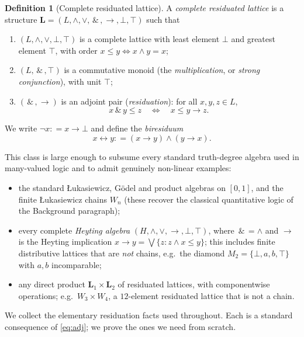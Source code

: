 \documentclass{amsart}
\theoremstyle{definition}
\newtheorem{definition}{Definition}
\theoremstyle{plain}
\newcommand{\eqdef}{\mathrel{\mathop:}=}
\newcommand{\bL}{\mathbf{L}}
\newcommand{\fto}{\rightarrow}
\newcommand{\fbi}{\leftrightarrow}
\newcommand{\odotop}{\,\&\,}
\newcommand{\Top}{\top}
\newcommand{\Bot}{\bot}
\begin{document}
\begin{definition}[Complete residuated lattice]\label{def:rl}
A \emph{complete residuated lattice} is a structure
$\bL=(L,\wedge,\vee,\odotop,\fto,\Bot,\Top)$ such that
\begin{enumerate}
\item $(L,\wedge,\vee,\Bot,\Top)$ is a complete lattice with least element
$\Bot$ and greatest element $\Top$, with order $x\le y \iff x\wedge y = x$;
\item $(L,\odotop,\Top)$ is a commutative monoid (the \emph{multiplication}, or
\emph{strong conjunction}), with unit $\Top$;
\item $(\odotop,\fto)$ is an adjoint pair (\emph{residuation}): for all
$x,y,z\in L$,
\begin{equation}\label{eq:adj}
x\odotop y \le z \quad\Longleftrightarrow\quad x \le y\fto z .
\end{equation}
\end{enumerate}
We write $\neg x \eqdef x\fto\Bot$ and define the \emph{biresiduum}
\begin{equation}\label{eq:bi}
x\fbi y \eqdef (x\fto y)\wedge(y\fto x).
\end{equation}
\end{definition}

This class is large enough to subsume every standard truth-degree algebra used
in many-valued logic and to admit genuinely non-linear examples:

\begin{itemize}
\item the standard \L ukasiewicz, G\"odel and product algebras on $[0,1]$, and
the finite \L ukasiewicz chains $W_n$ (these recover the classical quantitative
logic of the Background paragraph);
\item every complete \emph{Heyting algebra} $(H,\wedge,\vee,\fto,\Bot,\Top)$,
where $\odotop=\wedge$ and $\fto$ is the Heyting implication
$x\fto y=\bigvee\{z: z\wedge x\le y\}$; this includes finite distributive
lattices that are \emph{not} chains, e.g.\ the diamond
$M_2=\{\Bot,a,b,\Top\}$ with $a,b$ incomparable;
\item any direct product $\bL_1\times\bL_2$ of residuated lattices, with
componentwise operations; e.g.\ $W_3\times W_4$, a $12$-element residuated lattice
that is not a chain.
\end{itemize}

We collect the elementary residuation facts used throughout.  Each is a standard
consequence of \eqref{eq:adj}; we prove the ones we need from scratch.
\end{document}
